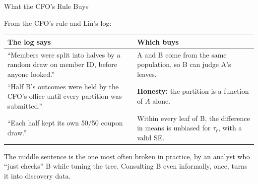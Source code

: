 \documentclass[aspectratio=169, 11pt, handout]{beamer}
\begin{document}
\begin{frame}{What the CFO's Rule Buys}

From the CFO's rule and Lin's log:

\begin{center}
\small
\begin{tabular}{p{6.2cm}p{6.6cm}}
\toprule
\textbf{The log says} & \textbf{Which buys} \\
\midrule
``Members were split into halves by a random draw on member ID, before anyone looked.'' & A and B come from the same population, so B can judge A's leaves. \\[0.4em]
``Half B's outcomes were held by the CFO's office until every partition was submitted.'' & \textbf{Honesty:} the partition is a function of $A$ alone. \\[0.4em]
``Each half kept its own 50/50 coupon draw.'' & Within every leaf of B, the difference in means is unbiased for $\tau_\ell$, with a valid SE. \\
\bottomrule
\end{tabular}
\end{center}

\bigskip

The middle sentence is the one most often broken in practice, by an analyst who ``just checks'' B while tuning the tree. Consulting B even informally, once, turns it into discovery data.
\end{frame}
\end{document}
